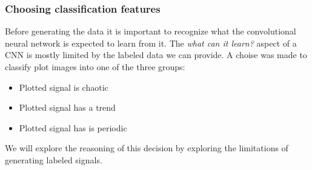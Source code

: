 \documentclass[a4paper,12pt,fleqn]{article}
\begin{document}
\subsubsection{Choosing classification features}
Before generating the data it is important to recognize what the convolutional neural network is expected to learn from it.
The \emph{what can it learn?} aspect of a CNN is mostly limited by the labeled data we can provide.
A choise was made to classify plot images into one of the three groups:
\begin{itemize}
  \item Plotted signal is chaotic
  \item Plotted signal has a trend
  \item Plotted signal has is periodic
\end{itemize}
We will explore the reasoning of this decision by exploring the limitations of generating labeled signals.


\end{document}
